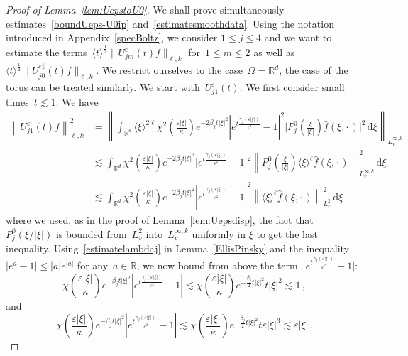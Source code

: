 \documentclass[11pt]{article}
\theoremstyle{definition}
\numberwithin{equation}{section}
\numberwithin{figure}{section}
\numberwithin{table}{section}
\newcommand*{\dd}{\mathrm{d}}
\newcommand*{\dxi}{\dd \xi}
\newcommand*\R {\mathbb{R}}
\newcommand*\eps{{\varepsilon}}
\begin{document}
\begin{proof}[Proof of Lemma~\ref{lem:UepstoU0}]
We shall prove simultaneously estimates~\eqref{boundUeps-U0ip} and~\eqref{estimatesmoothdata}. Using the notation introduced in Appendix~\ref{specBoltz}, we consider $1 \le j \le 4$ and we want to estimate the terms~$\langle t \rangle^{\frac12}\|U^\eps_{jm}(t)f\|_{\ell,k}$ for~$1 \le m \le 2$ as well as~$\langle t \rangle^{\frac 12}\|U^{\eps\sharp}_{j0}(t)f\|_{\ell,k}$. We restrict ourselves to the case~$\Omega = \R^d$, the case of the torus can be treated similarly. We start with~$U^\eps_{j1}(t)$. We first consider small times~$t \lesssim 1$. We have
\begin{align*}
\left\|U^\eps_{j1} (t)f\right\|_{\ell,k}^2
&= \left \| \int_{\R^d} \langle \xi \rangle^{2\ell} \chi^2\left(\frac{\eps|\xi|}{\kappa}\right) e^{- 2\beta_j t |\xi|^2} \left|e^{t \frac{\gamma_j(\eps|\xi|)}{\eps^2}}-1 \right|^2\Big|P_{j}^0\left(\frac{\xi}{|\xi|}\right)\widehat{f}(\xi,\cdot\,)\Big|^2 \, \dxi\right \|_{L^{\infty,k}_v} \\
&\lesssim \int_{\R^d} \chi^2\left(\frac{\eps|\xi|}{\kappa}\right) e^{- 2\beta_j t |\xi|^2} \Big|e^{t \frac{\gamma_j(\eps|\xi|)}{\eps^2}}-1 \Big|^2\left\|P_{j}^0\left(\frac{\xi}{|\xi|}\right)\langle \xi \rangle^\ell \widehat{f}(\xi,\cdot\,)\right\|^2_{L^{\infty,k}_v} \, \dxi\\
&\lesssim \int_{\R^d} \chi^2\left(\frac{\eps|\xi|}{\kappa}\right) e^{- 2\beta_j t |\xi|^2} \left|e^{t \frac{\gamma_j(\eps|\xi|)}{\eps^2}}-1 \right|^2\left\|\langle \xi \rangle^\ell \widehat{f}(\xi,\cdot\,)\right\|^2_{L^{2}_v} \, \dxi
\end{align*}
where we used, as in the proof of Lemma~\ref{lem:Uepsdisp}, the fact that $P_{j}^0(\xi/|\xi|)$ is bounded from~$L^2_v$ into~$L^{\infty,k}_v$ uniformly in $\xi$ to get the last inequality. Using~\eqref{estimatelambdaj} in Lemma~\ref{EllisPinsky} and the inequality $|e^a-1| \le |a| e^{|a|}$ for any~$a \in \R$, we now bound from above the term~$\big|e^{t \frac{\gamma_j(\eps|\xi|)}{\eps^2}}-1 \big|$:
\begin{equation}\label{estimategamma1}
\chi \left(\frac{\eps|\xi|}\kappa\right) e^{- \beta_j t |\xi|^2} \left|e^{t \frac{\gamma_j(\eps|\xi|)}{\eps^2}}-1 \right| \lesssim \chi\left (\frac{\eps|\xi|}\kappa\right) e^{- \frac{\beta_j }2 t |\xi|^2} t |\xi|^2 \lesssim 1\,,
\end{equation}
and
\begin{equation}\label{estimategamma2}
\chi\left(\frac{\eps|\xi|}\kappa\right) e^{- \beta_j t |\xi|^2} \left|e^{t \frac{\gamma_j(\eps|\xi|)}{\eps^2}}-1 \right| \lesssim \chi\left (\frac{\eps|\xi|}\kappa\right) e^{- \frac{\beta_j }2 t |\xi|^2} t \eps |\xi|^3 \lesssim \eps |\xi| \,.

\end{equation}
\end{proof}
\end{document}
